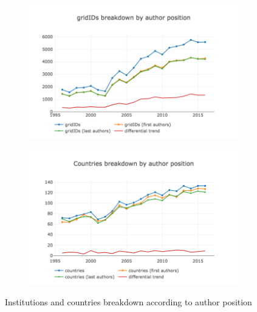 \documentclass{llncs}
\begin{document}
\begin{figure}[t]
\begin{subfigure}{.5\textwidth}
    \centering
	\includegraphics[width=\textwidth]{images/macro_gridids_vs_authors.png}
	\caption[ ]{}
	\label{fig:macro_gridids_vs_authors}
\end{subfigure}%
\begin{subfigure}{.5\textwidth}
	\centering
	\includegraphics[width=\textwidth]{images/macro_countries_vs_authors.png}
	\caption[ ]{}
	\label{fig:macro_countries_vs_authors}
\end{subfigure}
\caption{Institutions and countries breakdown according to author position}
\label{fig:macro_vs_authors}
\end{figure}
%
\end{document}
